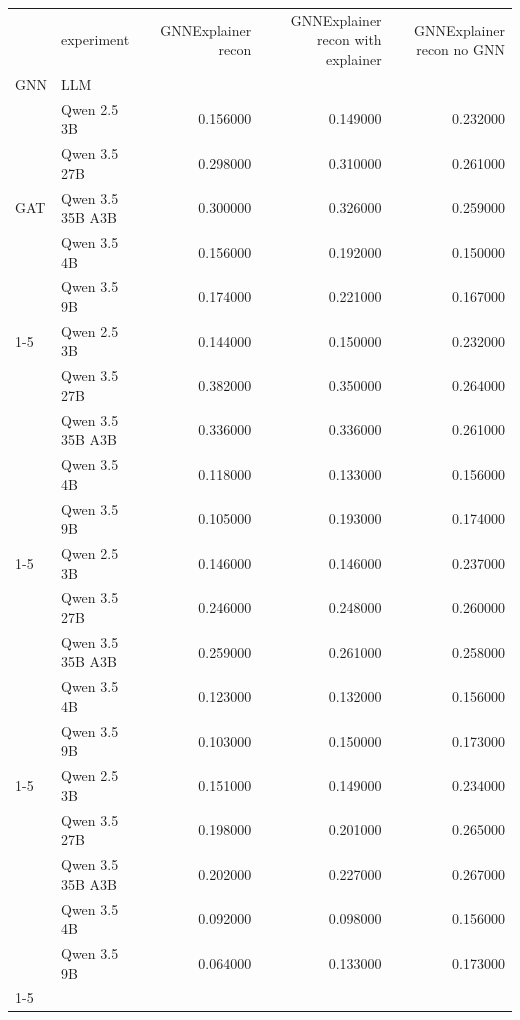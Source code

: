 \begin{tabular}{llrrr}
\toprule
 & experiment & GNNExplainer recon & GNNExplainer recon with explainer & GNNExplainer recon no GNN \\
GNN & LLM &  &  &  \\
\midrule
\multirow[t]{5}{*}{GAT} & Qwen 2.5 3B & 0.156000 & 0.149000 & 0.232000 \\
 & Qwen 3.5 27B & 0.298000 & 0.310000 & 0.261000 \\
 & Qwen 3.5 35B A3B & 0.300000 & 0.326000 & 0.259000 \\
 & Qwen 3.5 4B & 0.156000 & 0.192000 & 0.150000 \\
 & Qwen 3.5 9B & 0.174000 & 0.221000 & 0.167000 \\
\cline{1-5}
\multirow[t]{5}{*}{GCN} & Qwen 2.5 3B & 0.144000 & 0.150000 & 0.232000 \\
 & Qwen 3.5 27B & 0.382000 & 0.350000 & 0.264000 \\
 & Qwen 3.5 35B A3B & 0.336000 & 0.336000 & 0.261000 \\
 & Qwen 3.5 4B & 0.118000 & 0.133000 & 0.156000 \\
 & Qwen 3.5 9B & 0.105000 & 0.193000 & 0.174000 \\
\cline{1-5}
\multirow[t]{5}{*}{GIN} & Qwen 2.5 3B & 0.146000 & 0.146000 & 0.237000 \\
 & Qwen 3.5 27B & 0.246000 & 0.248000 & 0.260000 \\
 & Qwen 3.5 35B A3B & 0.259000 & 0.261000 & 0.258000 \\
 & Qwen 3.5 4B & 0.123000 & 0.132000 & 0.156000 \\
 & Qwen 3.5 9B & 0.103000 & 0.150000 & 0.173000 \\
\cline{1-5}
\multirow[t]{5}{*}{GraphSAGE} & Qwen 2.5 3B & 0.151000 & 0.149000 & 0.234000 \\
 & Qwen 3.5 27B & 0.198000 & 0.201000 & 0.265000 \\
 & Qwen 3.5 35B A3B & 0.202000 & 0.227000 & 0.267000 \\
 & Qwen 3.5 4B & 0.092000 & 0.098000 & 0.156000 \\
 & Qwen 3.5 9B & 0.064000 & 0.133000 & 0.173000 \\
\cline{1-5}
\bottomrule
\end{tabular}
